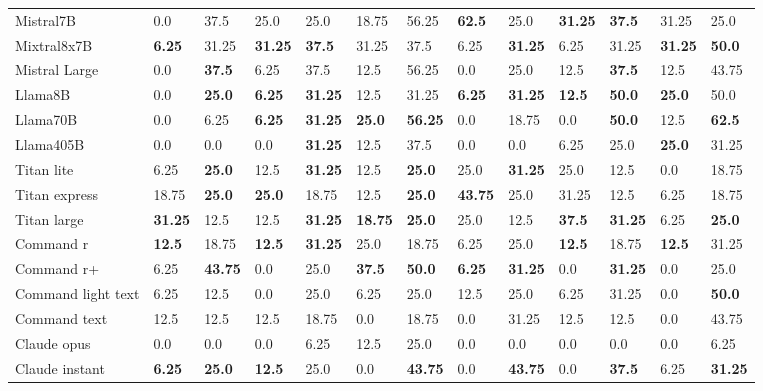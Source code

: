 \begin{table*}[h!]
\begin{tabular}{l|p{0.7cm}p{0.6cm}|p{0.7cm}p{0.6cm}|p{0.7cm}p{0.6cm}|p{0.7cm}p{0.6cm}|p{0.7cm}p{0.6cm}|p{0.7cm}p{0.6cm}}
Mistral7B & 0.0 & 37.5 & 25.0 & 25.0 & 18.75 & 56.25 & \textbf{62.5} & 25.0 & \textbf{31.25} & \textbf{37.5} & 31.25 & 25.0 \\ 
Mixtral8x7B & \textbf{6.25} & 31.25 & \textbf{31.25} & \textbf{37.5} & 31.25 & 37.5 & 6.25 & \textbf{31.25} & 6.25 & 31.25 & \textbf{31.25}  & \textbf{50.0 } \\ 
Mistral Large & 0.0 & \textbf{37.5} & 6.25 & 37.5 & 12.5 & 56.25 & 0.0 & 25.0 & 12.5 & \textbf{37.5} & 12.5 & 43.75 \\ \hline
Llama8B & 0.0 & \textbf{25.0} & \textbf{6.25} & \textbf{31.25} & 12.5 & 31.25 & \textbf{6.25} & \textbf{31.25}  & \textbf{12.5} & \textbf{50.0} & \textbf{25.0} & 50.0 \\ 
Llama70B & 0.0 & 6.25 & \textbf{6.25} & \textbf{31.25} & \textbf{25.0} & \textbf{56.25} & 0.0 & 18.75 & 0.0 & \textbf{50.0} & 12.5 & \textbf{62.5} \\ 
Llama405B & 0.0 & 0.0 & 0.0 & \textbf{31.25} & 12.5 & 37.5 & 0.0 & 0.0 & 6.25 & 25.0 & \textbf{25.0} & 31.25 \\ \hline
Titan lite & 6.25 & \textbf{25.0} & 12.5 & \textbf{31.25} & 12.5 & \textbf{25.0} & 25.0 & \textbf{31.25} & 25.0 & 12.5 & 0.0 & 18.75 \\
Titan express & 18.75 & \textbf{25.0} & \textbf{25.0} & 18.75 & 12.5 & \textbf{25.0} & \textbf{43.75} & 25.0 & 31.25 & 12.5 & 6.25 & 18.75 \\
Titan large & \textbf{31.25} & 12.5 & 12.5 & \textbf{31.25} & \textbf{18.75} & \textbf{25.0} & 25.0 & 12.5 & \textbf{37.5} & \textbf{31.25} & 6.25 & \textbf{25.0} \\ \hline
Command r & \textbf{12.5 }& 18.75 & \textbf{12.5} & \textbf{31.25}  & 25.0 & 18.75 & 6.25 & 25.0 & \textbf{12.5} & 18.75 & \textbf{12.5} & 31.25 \\ 
Command r+ & 6.25 & \textbf{43.75} & 0.0 & 25.0 & \textbf{37.5} & \textbf{50.0} & \textbf{6.25} & \textbf{31.25}  & 0.0 & \textbf{31.25} & 0.0 & 25.0 \\ 
Command light text & 6.25 & 12.5 & 0.0 & 25.0 & 6.25 & 25.0 & 12.5 & 25.0 & 6.25 & 31.25 & 0.0 & \textbf{50.0} \\ 
Command text & 12.5 & 12.5 & 12.5 & 18.75 & 0.0 & 18.75 & 0.0 & 31.25 & 12.5 & 12.5 & 0.0 & 43.75 \\ \hline
Claude opus & 0.0 & 0.0 & 0.0 & 6.25 & 12.5 & 25.0 & 0.0 & 0.0 & 0.0 & 0.0 & 0.0 & 6.25 \\ 
Claude instant & \textbf{6.25} & \textbf{25.0} & \textbf{12.5} & 25.0 & 0.0 & \textbf{43.75} & 0.0 & \textbf{43.75} & 0.0 & \textbf{37.5} & 6.25 & \textbf{31.25} \\ 

\end{tabular}
\end{table*}
